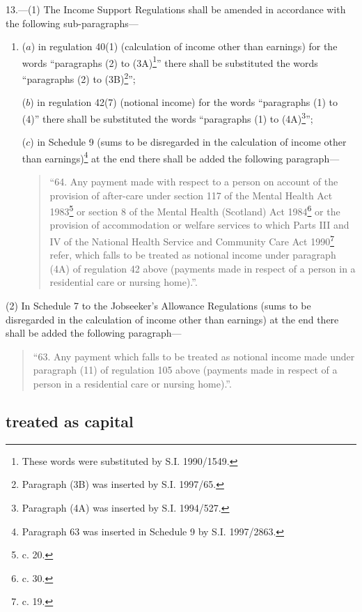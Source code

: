 \documentclass[12pt,a4paper]{article}
\begin{document}
13.---(1)  The Income Support Regulations shall be amended in accordance with the following sub-paragraphs—
\begin{enumerate}\item[]
($a$) in regulation 40(1) (calculation of income other than earnings) for the words “paragraphs (2) to (3A)\footnote{\frenchspacing These words were substituted by S.I. 1990/1549.}” there shall be substituted the words “paragraphs (2) to (3B)\footnote{\frenchspacing Paragraph (3B) was inserted by S.I. 1997/65.}”;

($b$) in regulation 42(7) (notional income) for the words “paragraphs (1) to (4)” there shall be substituted the words “paragraphs (1) to (4A)\footnote{\frenchspacing Paragraph (4A) was inserted by S.I. 1994/527.}”;

($c$) in Schedule 9 (sums to be disregarded in the calculation of income other than earnings)\footnote{\frenchspacing Paragraph 63 was inserted in Schedule 9 by S.I. 1997/2863.} at the end there shall be added the following paragraph—
\begin{quotation}
“64.  Any payment made with respect to a person on account of the provision of after-care under section 117 of the Mental Health Act 1983\footnote{ c. 20.} or section 8 of the Mental Health (Scotland) Act 1984\footnote{ c. 30.} or the provision of accommodation or welfare services to which Parts III and IV of the National Health Service and Community Care Act 1990\footnote{ c. 19.} refer, which falls to be treated as notional income under paragraph (4A) of regulation 42 above (payments made in respect of a person in a residential care or nursing home).”.
\end{quotation}
\end{enumerate}

(2) In Schedule 7 to the Jobseeker’s Allowance Regulations (sums to be disregarded in the calculation of income other than earnings) at the end there shall be added the following paragraph—
\begin{quotation}
“63.  Any payment which falls to be treated as notional income made under paragraph (11) of regulation 105 above (payments made in respect of a person in a residential care or nursing home).”.
\end{quotation}

\subsection[14. Income Support and Jobseeker’s Allowance: Income treated as capital]{\sloppy {} treated as capital}
\end{document}
